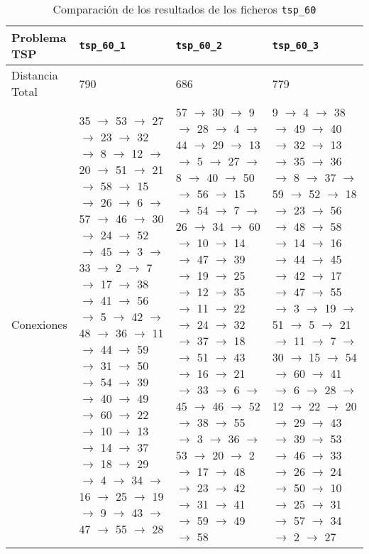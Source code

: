 \documentclass[a4paper,11pt]{article}
\begin{document}
\begin{table}[!htbp]
\label{results_tsp_60}
\centering
\begin{tabularx}{\textwidth}{|p{2cm}|X|X|X|}
\hline
Problema TSP    & \texttt{tsp\_60\_1}   & \texttt{tsp\_60\_2}   & \texttt{tsp\_60\_3}	\\ \hline
Distancia Total & 790   & 686   & 779	\\ \hline
Conexiones	& 35 $\to$ 53 $\to$ 27 $\to$ 23 $\to$ 32 $\to$ 8 $\to$ 12 $\to$ 20 $\to$ 51 $\to$ 21 $\to$ 58 $\to$ 15 $\to$ 26 $\to$ 6 $\to$ 57 $\to$ 46 $\to$ 30 $\to$ 24 $\to$ 52 $\to$ 45 $\to$ 3 $\to$ 33 $\to$ 2 $\to$ 7 $\to$ 17 $\to$ 38 $\to$ 41 $\to$ 56 $\to$ 5 $\to$ 42 $\to$ 48 $\to$ 36 $\to$ 11 $\to$ 44 $\to$ 59 $\to$ 31 $\to$ 50 $\to$ 54 $\to$ 39 $\to$ 40 $\to$ 49 $\to$ 60 $\to$ 22 $\to$ 10 $\to$ 13 $\to$ 14 $\to$ 37 $\to$ 18 $\to$ 29 $\to$ 4 $\to$ 34 $\to$ 16 $\to$ 25 $\to$ 19 $\to$ 9 $\to$ 43 $\to$ 47 $\to$ 55 $\to$ 28	& 57 $\to$ 30 $\to$ 9 $\to$ 28 $\to$ 4 $\to$ 44 $\to$ 29 $\to$ 13 $\to$ 5 $\to$ 27 $\to$ 8 $\to$ 40 $\to$ 50 $\to$ 56 $\to$ 15 $\to$ 54 $\to$ 7 $\to$ 26 $\to$ 34 $\to$ 60 $\to$ 10 $\to$ 14 $\to$ 47 $\to$ 39 $\to$ 19 $\to$ 25 $\to$ 12 $\to$ 35 $\to$ 11 $\to$ 22 $\to$ 24 $\to$ 32 $\to$ 37 $\to$ 18 $\to$ 51 $\to$ 43 $\to$ 16 $\to$ 21 $\to$ 33 $\to$ 6 $\to$ 45 $\to$ 46 $\to$ 52 $\to$ 38 $\to$ 55 $\to$ 3 $\to$ 36 $\to$ 53 $\to$ 20 $\to$ 2 $\to$ 17 $\to$ 48 $\to$ 23 $\to$ 42 $\to$ 31 $\to$ 41 $\to$ 59 $\to$ 49 $\to$ 58	& 9 $\to$ 4 $\to$ 38 $\to$ 49 $\to$ 40 $\to$ 32 $\to$ 13 $\to$ 35 $\to$ 36 $\to$ 8 $\to$ 37 $\to$ 59 $\to$ 52 $\to$ 18 $\to$ 23 $\to$ 56 $\to$ 48 $\to$ 58 $\to$ 14 $\to$ 16 $\to$ 44 $\to$ 45 $\to$ 42 $\to$ 17 $\to$ 47 $\to$ 55 $\to$ 3 $\to$ 19 $\to$ 51 $\to$ 5 $\to$ 21 $\to$ 11 $\to$ 7 $\to$ 30 $\to$ 15 $\to$ 54 $\to$ 60 $\to$ 41 $\to$ 6 $\to$ 28 $\to$ 12 $\to$ 22 $\to$ 20 $\to$ 29 $\to$ 43 $\to$ 39 $\to$ 53 $\to$ 46 $\to$ 33 $\to$ 26 $\to$ 24 $\to$ 50 $\to$ 10 $\to$ 25 $\to$ 31 $\to$ 57 $\to$ 34 $\to$ 2 $\to$ 27	\\ \hline
\end{tabularx}
\caption{Comparación de los resultados de los ficheros \texttt{tsp\_60}}
\end{table}
\end{document}
